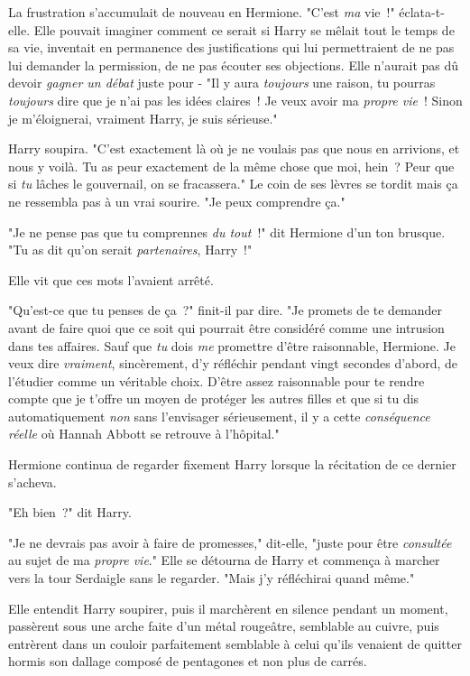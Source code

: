 La frustration s'accumulait de nouveau en Hermione. "C'est \emph{ma} vie~!" éclata-t-elle. Elle pouvait imaginer comment ce serait si Harry se mêlait tout le temps de sa vie, inventait en permanence des justifications qui lui permettraient de ne pas lui demander la permission, de ne pas écouter ses objections. Elle n'aurait pas dû devoir \emph{gagner un débat} juste pour - "Il y aura \emph{toujours} une raison, tu pourras \emph{toujours} dire que je n'ai pas les idées claires~! Je veux avoir ma \emph{propre vie}~! Sinon je m'éloignerai, vraiment Harry, je suis sérieuse."

Harry soupira. "C'est exactement là où je ne voulais pas que nous en arrivions, et nous y voilà. Tu as peur exactement de la même chose que moi, hein~? Peur que si \emph{tu} lâches le gouvernail, on se fracassera." Le coin de ses lèvres se tordit mais ça ne ressembla pas à un vrai sourire. "Je peux comprendre ça."

"Je ne pense pas que tu comprennes \emph{du tout}~!" dit Hermione d'un ton brusque. "Tu as dit qu'on serait \emph{partenaires}, Harry~!"

Elle vit que ces mots l'avaient arrêté.

"Qu'est-ce que tu penses de ça~?" finit-il par dire. "Je promets de te demander avant de faire quoi que ce soit qui pourrait être considéré comme une intrusion dans tes affaires. Sauf que \emph{tu} dois \emph{me} promettre d'être raisonnable, Hermione. Je veux dire \emph{vraiment}, sincèrement, d'y réfléchir pendant vingt secondes d'abord, de l'étudier comme un véritable choix. D'être assez raisonnable pour te rendre compte que je t'offre un moyen de protéger les autres filles et que si tu dis automatiquement \emph{non} sans l'envisager sérieusement, il y a cette \emph{conséquence réelle} où Hannah Abbott se retrouve à l'hôpital."

Hermione continua de regarder fixement Harry lorsque la récitation de ce dernier s'acheva.

"Eh bien~?" dit Harry.

"Je ne devrais pas avoir à faire de promesses," dit-elle, "juste pour être \emph{consultée} au sujet de ma \emph{propre vie}." Elle se détourna de Harry et commença à marcher vers la tour Serdaigle sans le regarder. "Mais j'y réfléchirai quand même."

Elle entendit Harry soupirer, puis il marchèrent en silence pendant un moment, passèrent sous une arche faite d'un métal rougeâtre, semblable au cuivre, puis entrèrent dans un couloir parfaitement semblable à celui qu'ils venaient de quitter hormis son dallage composé de pentagones et non plus de carrés.


